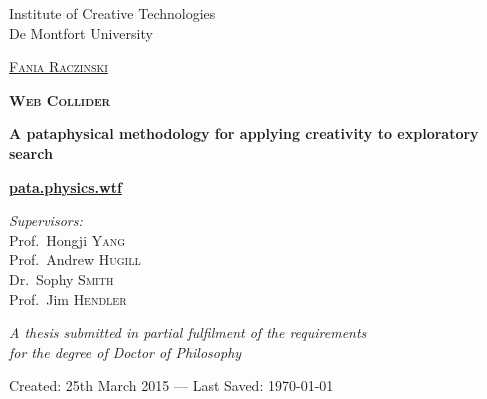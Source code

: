
\begin{titlepage}
\begin{center}

Institute of Creative Technologies\\
De Montfort University

\vspace{2cm}

\textsc{\huge \href{http://fania.uk}{Fania Raczinski}}

\vspace{2cm}


\textsc{\Huge \bfseries Web Collider}

\vspace{1.5cm}

{\huge \bfseries A pataphysical methodology for applying creativity to exploratory search}

\vspace{1cm}
{\Huge \textbf{\url{pata.physics.wtf}}}
\vspace{2cm}

\emph{Supervisors:}\\
{Prof.\ Hongji \textsc{Yang}}\\
{Prof.\ Andrew \textsc{Hugill}}\\
{Dr.\ Sophy \textsc{Smith}}\\
{Prof.\ Jim \textsc{Hendler}}

\vspace{1.5cm}

\large \textit{A thesis submitted in partial fulfilment of the requirements\\ for the degree of Doctor of Philosophy}

\vfill

Created: {25th March 2015} --- Last Saved: {\today}\\

\end{center}
\end{titlepage}
